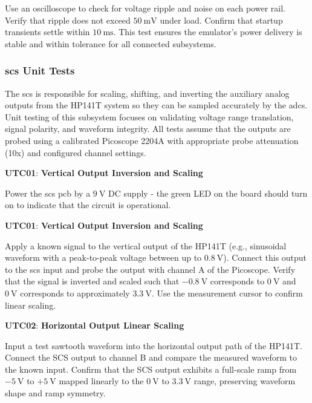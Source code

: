 \documentclass[class=report,11pt,crop=false]{standalone}
\begin{document}
	Use an oscilloscope to check for voltage ripple and noise on each power rail. Verify that ripple does not exceed $\SI{50}{\milli\volt}$ under load. Confirm that startup transients settle within $\SI{10}{\milli\second}$. This test ensures the emulator's power delivery is stable and within tolerance for all connected subsystems.
	
	\subsubsection{\acrlong{scs} Unit Tests}
	The \acrfull{scs} is responsible for scaling, shifting, and inverting the auxiliary analog outputs from the HP141T system so they can be sampled accurately by the \acrshort{adc}s. Unit testing of this subsystem focuses on validating voltage range translation, signal polarity, and waveform integrity. All tests assume that the outputs are probed using a calibrated Picoscope 2204A with appropriate probe attenuation (10x) and configured channel settings. 
	
	\begin{center}
		\textbf{UTC01}: \textbf{Vertical Output Inversion and Scaling}
	\end{center}
	Power the \acrshort{scs} \acrshort{pcb} by a $\SI{9}{\volt}$ DC supply - the green LED on the board should turn on to indicate that the circuit is operational.
	
	\begin{center}
		\textbf{UTC01}: \textbf{Vertical Output Inversion and Scaling}
	\end{center}
	Apply a known signal to the vertical output of the HP141T (e.g., sinusoidal waveform with a peak-to-peak voltage between up to $\SI{0.8}{\volt}$). Connect this output to the \acrshort{scs} input and probe the output with channel A of the Picoscope. Verify that the signal is inverted and scaled such that $-\SI{0.8}{\volt}$ corresponds to $\SI{0}{\volt}$ and $\SI{0}{\volt}$ corresponds to approximately $\SI{3.3}{\volt}$. Use the measurement cursor to confirm linear scaling.
	
	\begin{center}
		\textbf{UTC02}: \textbf{Horizontal Output Linear Scaling}
	\end{center}
	Input a test sawtooth waveform into the horizontal output path of the HP141T. Connect the SCS output to channel B and compare the measured waveform to the known input. Confirm that the SCS output exhibits a full-scale ramp from $-\SI{5}{\volt}$ to $+\SI{5}{\volt}$ mapped linearly to the $\SI{0}{\volt}$ to $\SI{3.3}{\volt}$ range, preserving waveform shape and ramp symmetry.
	
\end{document}
